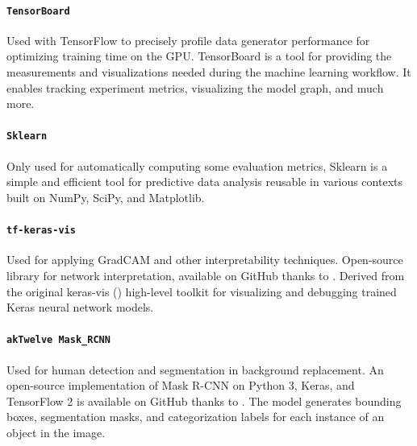 \paragraph*{\texttt{TensorBoard}}
Used with TensorFlow to precisely profile data generator performance for optimizing training time on the GPU. TensorBoard is a tool for providing the measurements and visualizations needed during the machine learning workflow. It enables tracking experiment metrics, visualizing the model graph, and much more.

\paragraph*{\texttt{Sklearn}}
Only used for automatically computing some evaluation metrics, Sklearn is a simple and efficient tool for predictive data analysis reusable in various contexts built on NumPy, SciPy, and Matplotlib.

\paragraph*{\texttt{tf-keras-vis}}
Used for applying GradCAM and other interpretability techniques. Open-source library for network interpretation, available on GitHub thanks to \cite{tf-keras-vis}. Derived from the original keras-vis (\cite{keras-vis}) high-level toolkit for visualizing and debugging trained Keras neural network models.

\paragraph*{\texttt{akTwelve Mask\_RCNN}}
Used for human detection and segmentation in background replacement. An open-source implementation of Mask R-CNN on Python 3, Keras, and TensorFlow 2 is available on GitHub thanks to \cite{MaskRCNN_akTwelve}. The model generates bounding boxes, segmentation masks, and categorization labels for each instance of an object in the image.







